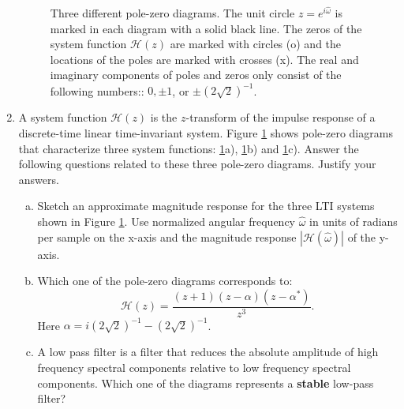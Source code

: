 \begin{enumerate}
\begin{figure}[!h]
\begin{center}
\begin{minipage}{0.32\textwidth}
\end{minipage}
\end{center}
\caption{Three different pole-zero diagrams. The unit circle $z=e^{i\hat{\omega}}$ is marked in each diagram with a solid black line. The zeros of the system function $\mathcal{H}(z)$ are marked with circles (o) and the locations of the poles are marked with crosses (x). The real and imaginary components of poles and zeros only consist of the following numbers:: $0, \pm 1$, or $\pm (2\sqrt{2})^{-1}$.}
\label{fig:exzone}
\end{figure}

\item A system function $\mathcal{H}(z)$ is the $z$-transform of the impulse response of a discrete-time linear time-invariant system. Figure \ref{fig:exzone} shows pole-zero diagrams that characterize three system functions: \ref{fig:exzone}a), \ref{fig:exzone}b) and \ref{fig:exzone}c). Answer the following questions related to these three pole-zero diagrams. Justify your answers.

\begin{enumerate}[a)]

\item Sketch an approximate magnitude response for the three LTI systems shown
in Figure \ref{fig:exzone}. Use normalized angular frequency $\hat{\omega}$
in units of radians per sample on the x-axis and the magnitude
response $|\mathcal{H}(\hat{\omega})|$ of the y-axis.


\item  Which one of the pole-zero diagrams corresponds to:
\begin{equation}
\mathcal{H}(z) = \frac{(z+1)(z-\alpha)(z-\alpha^*)}{z^3}.
\end{equation}
Here $\alpha=i (2\sqrt{2})^{-1} - (2\sqrt{2})^{-1}$.


\item A low pass filter is a filter that reduces the absolute
amplitude of high frequency spectral components relative to low
frequency spectral components. Which one of the diagrams represents
a \textbf{stable} low-pass filter?


\end{enumerate}
\end{enumerate}
